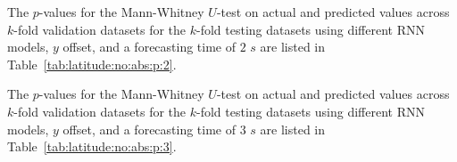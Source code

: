 The $p$-values for the Mann-Whitney $U$-test on actual and predicted values across $k$-fold validation datasets for the $k$-fold testing datasets using different RNN models, $y$ offset, and a forecasting time of $2$ $s$ are listed in Table~\ref{tab:latitude:no:abs:p:2}.

\begin{table}[!ht]
	\centering
	\caption{The $p$-values for the Mann-Whitney $U$-test on actual and predicted values across $k$-fold validation datasets for the $k$-fold testing datasets using different RNN models, $y$ offset, and a forecasting time of $2$ $s$.}
	\label{tab:latitude:no:abs:p:2}
\end{table}

The $p$-values for the Mann-Whitney $U$-test on actual and predicted values across $k$-fold validation datasets for the $k$-fold testing datasets using different RNN models, $y$ offset, and a forecasting time of $3$ $s$ are listed in Table~\ref{tab:latitude:no:abs:p:3}.

